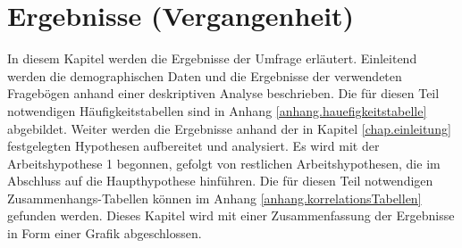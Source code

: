 %
%
\glsresetall
\let\raggedsection\centering
\chapter{Ergebnisse (Vergangenheit)}
\let\raggedsection\raggedright 
In diesem Kapitel werden die Ergebnisse der Umfrage erläutert. Einleitend werden die demographischen Daten und die Ergebnisse der verwendeten Fragebögen anhand einer deskriptiven Analyse beschrieben. Die für diesen Teil notwendigen Häufigkeitstabellen sind in Anhang \ref{anhang.hauefigkeitstabelle} abgebildet. Weiter werden die Ergebnisse anhand der in Kapitel \ref{chap.einleitung} festgelegten Hypothesen aufbereitet und analysiert. Es wird mit der Arbeitshypothese 1 begonnen, gefolgt von restlichen Arbeitshypothesen, die im Abschluss auf die Haupthypothese hinführen. Die für diesen Teil notwendigen Zusammenhangs-Tabellen können im Anhang \ref{anhang.korrelationsTabellen} gefunden werden. Dieses Kapitel wird mit einer Zusammenfassung der Ergebnisse in Form einer Grafik abgeschlossen.


